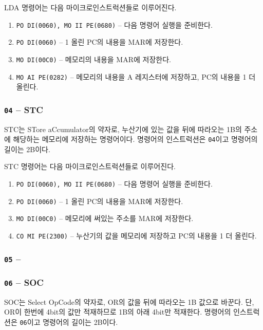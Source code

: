 \documentclass{article}
\begin{document}
LDA 명령어는 다음 마이크로인스트럭션들로 이루어진다.

\begin{enumerate}
    \item \texttt{PO DI(0060), MO II PE(0680)} -- 다음 명령어 실행을 준비한다.
    \setcounter{enumi}{2}
    \item \texttt{PO DI(0060)} -- 1 올린 PC의 내용을 MAR에 저장한다.
    \item \texttt{MO DI(00C0)} -- 메모리의 내용을 MAR에 저장한다.
    \item \texttt{MO AI PE(0282)} -- 메모리의 내용을 A 레지스터에 저장하고,
        PC의 내용을 1 더 올린다.
\end{enumerate}

\subsubsection{\texttt{04} -- STC}

STC는 STore aCcumulator의 약자로, 누산기에 있는 값을
뒤에 따라오는 1B의 주소에 해당하는 메모리에 저장하는 명령어이다.
명령어의 인스트럭션은 \texttt{04}이고 명령어의 길이는 2B이다.

STC 명령어는 다음 마이크로인스트럭션들로 이루어진다.

\begin{enumerate}
    \item \texttt{PO DI(0060), MO II PE(0680)} -- 다음 명령어 실행을 준비한다.
    \setcounter{enumi}{2}
    \item \texttt{PO DI(0060)} -- 1 올린 PC의 내용을 MAR에 저장한다.
    \item \texttt{MO DI(00C0)} -- 메모리에 써있는 주소를 MAR에 저장한다.
    \item \texttt{CO MI PE(2300)} -- 누산기의 값을 메모리에 저장하고
        PC의 내용을 1 더 올린다.
\end{enumerate}

\subsubsection{\texttt{05} -- }

\subsubsection{\texttt{06} -- SOC}

SOC는 Select OpCode의 약자로, OR의 값을 뒤에 따라오는 1B 값으로 바꾼다.
단, OR이 한번에 4bit의 값만 적재하므로 1B의 아래 4bit만 적재한다.
명령어의 인스트럭션은 \texttt{06}이고 명령어의 길이는 2B이다.
\end{document}
